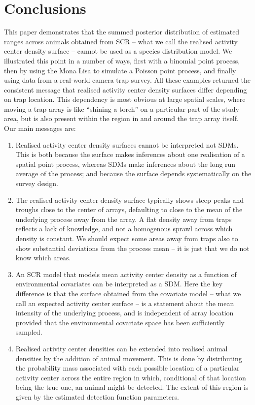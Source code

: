 \documentclass[10pt,a4paper]{article}
\begin{document}
\section{Conclusions}
This paper demonstrates that the summed posterior distribution of estimated ranges across animals obtained from SCR -- what we call the realised activity center density surface -- cannot be used as a species distribution model. We illustrated this point in a number of ways, first with a binomial point process, then by using the Mona Lisa to simulate a Poisson point process, and finally using data from a real-world camera trap survey. All these examples returned the consistent message that realised activity center density surfaces differ depending on trap location. This dependency is most obvious at large spatial scales, where moving a trap array is like ``shining a torch'' on a particular part of the study area, but is also present within the region in and around the trap array itself. Our main messages are:
\begin{enumerate}
\item Realised activity center density surfaces cannot be interpreted not SDMs. This is both because the surface makes inferences about one realisation of a spatial point process, whereas SDMs make inferences about the long run average of the process; and because the surface depends systematically on the survey design.
\item The realised activity center density surface typically shows steep peaks and troughs close to the center of arrays, defaulting to close to the mean of the underlying process away from the array. A flat density away from traps reflects a lack of knowledge, and not a homogenous sprawl across which density is constant. We should expect some areas away from traps also to show substantial deviations from the process mean -- it is just that we do not know which areas.
\item An SCR model that models mean activity center density as a function of environmental covariates can be interpreted as a SDM. Here the key difference is that the surface obtained from the covariate model -- what we call an expected activity center surface -- is a statement about the mean intensity of the underlying process, and is independent of array location provided that the environmental covariate space has been sufficiently sampled.
\item Realised activity center densities can be extended into realised animal densities by the addition of animal movement. This is done by distributing the probability mass associated with each possible location of a particular activity center across the entire region in which, conditional of that location being the true one, an animal might be detected. The extent of this region is given by the estimated detection function parameters. 
\end{enumerate}




\end{document}
